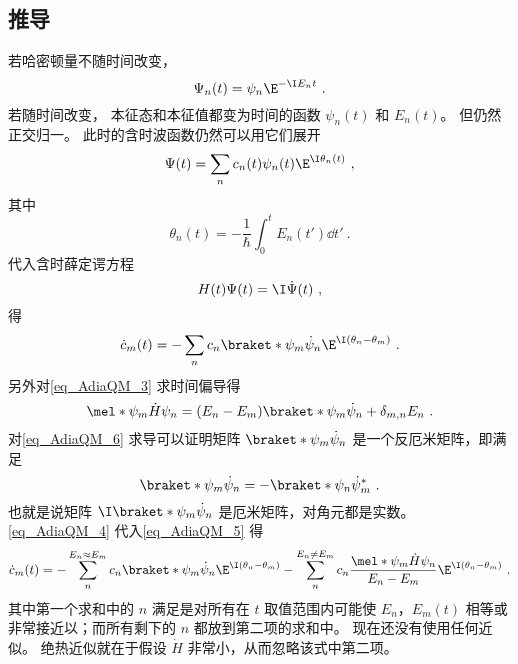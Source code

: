 \subsection{推导}
若哈密顿量不随时间改变，
\begin{equation}
\Psi_n(t) = \psi_n \E^{-\I E_n t}~.
\end{equation}
若随时间改变， 本征态和本征值都变为时间的函数 $\psi_n(t)$ 和 $E_n(t)$。 但仍然正交归一。 此时的含时波函数仍然可以用它们展开
\begin{equation}
\Psi(t) = \sum_n c_n(t) \psi_n(t) \E^{\I \theta_n(t)}~,
\end{equation}
其中
\begin{equation}
\theta_n(t) = -\frac{1}{\hbar} \int_0^t E_n(t')\dd{t'}~.
\end{equation}
代入含时薛定谔方程
\begin{equation}\label{eq_AdiaQM_1}
H(t)\Psi(t) = \I \dot \Psi(t)~,
\end{equation}
得
\begin{equation}\label{eq_AdiaQM_5}
\dot c_m(t) = -\sum_n c_n \braket*{\psi_m}{\dot\psi_n}\E^{\I(\theta_n-\theta_m)}~.
\end{equation}
另外对\autoref{eq_AdiaQM_3} 求时间偏导得
\begin{equation}\label{eq_AdiaQM_4}
\mel*{\psi_m}{\dot H}{\psi_n} = (E_n-E_m)\braket*{\psi_m}{\dot\psi_n} + \delta_{m,n}E_n~.
\end{equation}
对\autoref{eq_AdiaQM_6} 求导可以证明矩阵 $\braket*{\psi_m}{\dot\psi_n}$ 是一个反厄米矩阵，即满足
\begin{equation}\label{eq_AdiaQM_7}
\braket*{\psi_m}{\dot\psi_n} = -\braket*{\psi_n}{\dot\psi_m}^*~.
\end{equation}
也就是说矩阵 $\I\braket*{\psi_m}{\dot\psi_n}$ 是厄米矩阵，对角元都是实数。
\autoref{eq_AdiaQM_4} 代入\autoref{eq_AdiaQM_5} 得
\begin{equation}\label{eq_AdiaQM_8}
\dot c_m(t) = - \sum_{n}^{E_n\approx E_m} c_n \braket*{\psi_m}{\dot\psi_n}\E^{\I(\theta_n-\theta_m)}
- \sum_{n}^{E_n\ne E_m} c_n \frac{\mel*{\psi_m}{\dot H}{\psi_n}}{E_n-E_m}\E^{\I(\theta_n-\theta_m)}~.
\end{equation}
其中第一个求和中的 $n$ 满足是对所有在 $t$ 取值范围内可能使 $E_n$，$E_m(t)$ 相等或非常接近以；而所有剩下的 $n$ 都放到第二项的求和中。 现在还没有使用任何近似。 绝热近似就在于假设 $\dot H$ 非常小，从而忽略该式中第二项。


